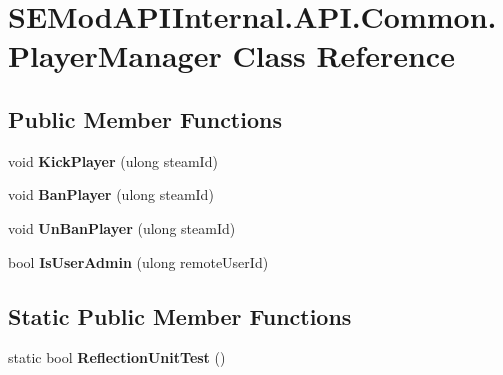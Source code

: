\hypertarget{class_s_e_mod_a_p_i_internal_1_1_a_p_i_1_1_common_1_1_player_manager}{}\section{S\+E\+Mod\+A\+P\+I\+Internal.\+A\+P\+I.\+Common.\+Player\+Manager Class Reference}
\label{class_s_e_mod_a_p_i_internal_1_1_a_p_i_1_1_common_1_1_player_manager}
\subsection*{Public Member Functions}
\begin{DoxyCompactItemize}
\item 
\hypertarget{class_s_e_mod_a_p_i_internal_1_1_a_p_i_1_1_common_1_1_player_manager_a9f9a0111f7b0d2d33b76452c13f2a7fd}{}void {\bfseries Kick\+Player} (ulong steam\+Id)\label{class_s_e_mod_a_p_i_internal_1_1_a_p_i_1_1_common_1_1_player_manager_a9f9a0111f7b0d2d33b76452c13f2a7fd}

\item 
\hypertarget{class_s_e_mod_a_p_i_internal_1_1_a_p_i_1_1_common_1_1_player_manager_a2d3095e4b64b63e214d2b095542a5966}{}void {\bfseries Ban\+Player} (ulong steam\+Id)\label{class_s_e_mod_a_p_i_internal_1_1_a_p_i_1_1_common_1_1_player_manager_a2d3095e4b64b63e214d2b095542a5966}

\item 
\hypertarget{class_s_e_mod_a_p_i_internal_1_1_a_p_i_1_1_common_1_1_player_manager_a0a4fa75ff55040a0a13a26e0b19ca081}{}void {\bfseries Un\+Ban\+Player} (ulong steam\+Id)\label{class_s_e_mod_a_p_i_internal_1_1_a_p_i_1_1_common_1_1_player_manager_a0a4fa75ff55040a0a13a26e0b19ca081}

\item 
\hypertarget{class_s_e_mod_a_p_i_internal_1_1_a_p_i_1_1_common_1_1_player_manager_a219a6d169ad715fa55c060eb32faa700}{}bool {\bfseries Is\+User\+Admin} (ulong remote\+User\+Id)\label{class_s_e_mod_a_p_i_internal_1_1_a_p_i_1_1_common_1_1_player_manager_a219a6d169ad715fa55c060eb32faa700}

\end{DoxyCompactItemize}
\subsection*{Static Public Member Functions}
\begin{DoxyCompactItemize}
\item 
\hypertarget{class_s_e_mod_a_p_i_internal_1_1_a_p_i_1_1_common_1_1_player_manager_abf20511bc158febb34d7a6f198390686}{}static bool {\bfseries Reflection\+Unit\+Test} ()\label{class_s_e_mod_a_p_i_internal_1_1_a_p_i_1_1_common_1_1_player_manager_abf20511bc158febb34d7a6f198390686}

\end{DoxyCompactItemize}
